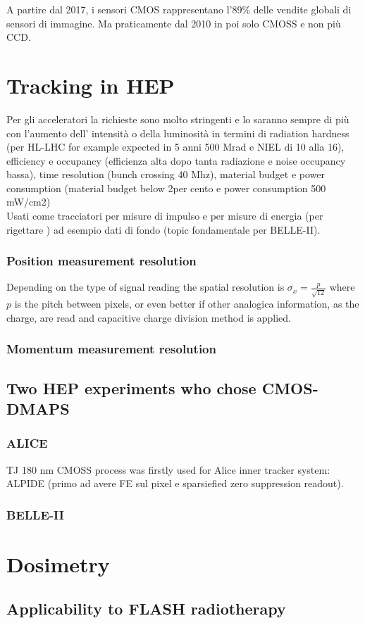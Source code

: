 A partire dal 2017, i sensori CMOS rappresentano l'89\% delle vendite globali di sensori di immagine. Ma praticamente dal 2010 in poi solo CMOSS e non più CCD.\\

\section{Tracking in HEP}
    Per gli acceleratori la richieste sono molto stringenti e lo saranno sempre di più con l'aumento dell' intensità o della luminosità in termini di radiation hardness (per HL-LHC for example expected in 5 anni 500 Mrad e NIEL di 10 alla 16), efficiency e occupancy (efficienza alta dopo tanta radiazione e noise occupancy bassa), time resolution (bunch crossing 40 Mhz), material budget e power consumption (material budget below 2per cento e power consumption 500 mW/cm2)\\
    Usati come tracciatori per misure di impulso e per misure di energia (per rigettare ) ad esempio dati di fondo (topic fondamentale per BELLE-II).

    \subsubsection{Position measurement resolution}
        Depending on the type of signal reading the spatial resolution is  $\sigma_x = \frac{p}{\sqrt{12}}$ where $p$ is the pitch between pixels, or even better if other 
        analogica information, as the charge, are read and capacitive charge division method is applied.
    \subsubsection{Momentum measurement resolution}

    \subsection{Two HEP experiments who chose CMOS-DMAPS}

        \subsubsection{ALICE}
            TJ 180 nm CMOSS process was firstly used for Alice inner tracker system: ALPIDE (primo ad avere FE sul pixel e sparsiefied zero suppression readout).
        \subsubsection{BELLE-II}

\section{Dosimetry}
    \subsection{Applicability to FLASH radiotherapy}